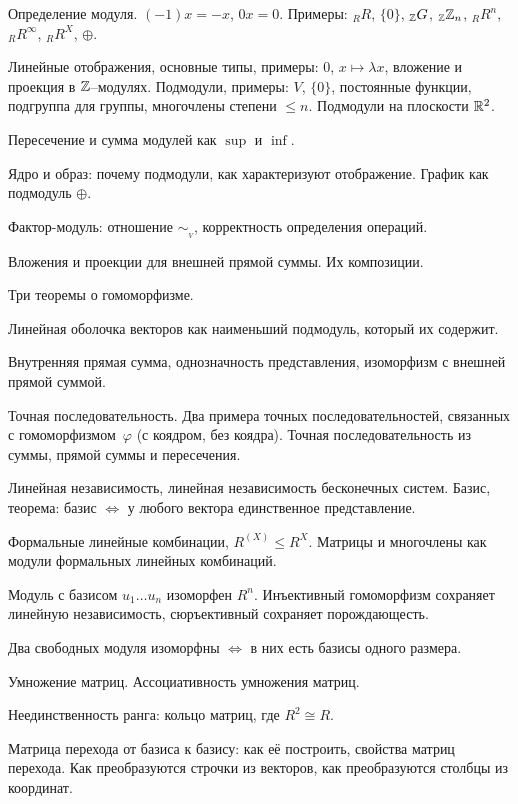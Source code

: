 \documentclass[a4paper]{extarticle}
\begin{document}
\begin{enumerate}

\itm Определение модуля. $(-1)x = -x$, $0x = 0$. Примеры: $_RR$, $\{0\}$, $_{\mathbb Z} G$, $_{\mathbb Z}\mathbb Z_n$, $_RR^n$, $_RR^\infty$, $_RR^X$, $\oplus$.

\itm Линейные отображения, основные типы, примеры: $0$, $x \mapsto \lambda x$, вложение и проекция в $\mathbb Z$--модулях. Подмодули, примеры: $V$, $\{0\}$, постоянные функции, подгруппа для группы, многочлены степени $\le n$. Подмодули на плоскости $\mathbb R^2$.

\itm Пересечение и сумма модулей как $\sup$ и $\inf$.

\itm Ядро и образ: почему подмодули, как характеризуют отображение. График как подмодуль $\oplus$.

\itm Фактор-модуль: отношение $\sim_{_V}$, корректность определения операций.

\itm Вложения и проекции для внешней прямой суммы. Их композиции.

\itm Три теоремы о гомоморфизме.

\itm Линейная оболочка векторов как наименьший подмодуль, который их содержит.

\itm Внутренняя прямая сумма, однозначность представления, изоморфизм с внешней прямой суммой.

\itm Точная последовательность. Два примера точных последовательностей, связанных с гомоморфизмом~$\varphi$ (с коядром, без коядра). Точная последовательность из суммы, прямой суммы и пересечения.

\itm Линейная независимость, линейная независимость бесконечных систем. Базис, теорема: базис $\Leftrightarrow$ у любого вектора единственное представление.

\itm Формальные линейные комбинации, $R^{(X)} \leqslant R^X$. Матрицы и многочлены как модули формальных линейных комбинаций.

\itm Модуль с базисом $u_1 \ldots u_n$ изоморфен $R^n$. Инъективный гомоморфизм сохраняет линейную независимость, сюръективный сохраняет порождающесть.

\itm Два свободных модуля изоморфны $\Longleftrightarrow$ в них есть базисы одного размера.

\itm Умножение матриц. Ассоциативность умножения матриц.

\itm Неединственность ранга: кольцо матриц, где $R^2 \cong R$.

\itm Матрица перехода от базиса к базису: как её построить, свойства матриц перехода. Как преобразуются строчки из векторов, как преобразуются столбцы из координат.


\end{enumerate}
\end{document}
